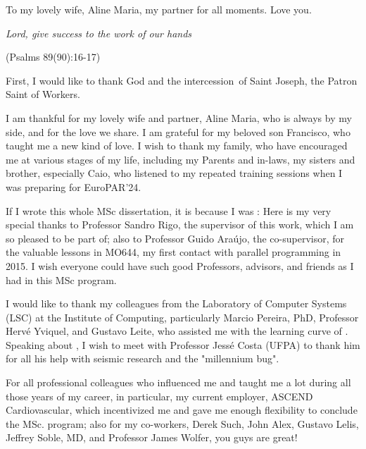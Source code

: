 \documentclass[Ingles]{ic-tese-v3}
\begin{document}


\paginasiniciais


To my lovely wife, Aline Maria, my partner for all moments. Love you.


\begin{epigrafe}
{\it
Lord, give success to the work of our hands
}

\hfill (Psalms 89(90):16-17)
\end{epigrafe}


First, I would like to thank God and the intercession of Saint Joseph, the Patron Saint of Workers. 

I am thankful for my lovely wife and partner, Aline Maria, who is always by my side, and for the love we share. I am grateful for my beloved son Francisco, who taught me a new kind of love. I wish to thank my family, who have encouraged me at various stages of my life, including my Parents and in-laws, my sisters and brother, especially Caio, who listened to my repeated training sessions when I was preparing for EuroPAR'24.

If I wrote this whole MSc dissertation, it is because I was : Here is my very special thanks to Professor Sandro Rigo, the supervisor of this work, which I am so pleased to be part of; also to Professor Guido Araújo, the co-supervisor, for the valuable lessons in MO644, my first contact with parallel programming in 2015. I wish everyone could have such good Professors, advisors, and friends as I had in this MSc program.

I would like to thank my colleagues from the Laboratory of Computer Systems (LSC) at the Institute of Computing, particularly Marcio Pereira, PhD, Professor Hervé Yviquel, and Gustavo Leite, who assisted me with the learning curve of \awave. Speaking about \awave, I wish to meet with Professor Jessé Costa (UFPA) to thank him for all his help with seismic research and the "millennium bug".

For all professional colleagues who influenced me and taught me a lot during all those years of my career, in particular, my current employer, ASCEND Cardiovascular, which incentivized me and gave me enough flexibility to conclude the MSc. program; also for my co-workers, Derek Such, John Alex, Gustavo Lelis, Jeffrey Soble, MD, and Professor James Wolfer, you guys are great!
\end{document}
